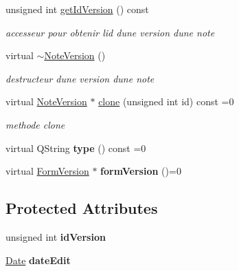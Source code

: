 \begin{DoxyCompactItemize}
\mbox{\label{class_note_version_a45dcb249d3bc6ce68f8c9dcabf153187}} 
unsigned int \hyperlink{class_note_version_a45dcb249d3bc6ce68f8c9dcabf153187}{get\+Id\+Version} () const
\begin{DoxyCompactList}\small\item\em accesseur pour obtenir l\textquotesingle{}id d\textquotesingle{}une version d\textquotesingle{}une note \end{DoxyCompactList}\item 
virtual \hyperlink{class_note_version_a84b32b9c97fa1de8b37b1170b9453f00}{$\sim$\+Note\+Version} ()
\begin{DoxyCompactList}\small\item\em destructeur d\textquotesingle{}une version d\textquotesingle{}une note \end{DoxyCompactList}\item 
virtual \hyperlink{class_note_version}{Note\+Version} $\ast$ \hyperlink{class_note_version_a7eb23a52291ec623b9bc1b6fe3e86c5a}{clone} (unsigned int id) const =0
\begin{DoxyCompactList}\small\item\em methode clone \end{DoxyCompactList}\item 
\mbox{\label{class_note_version_a950a828eafaae43fff4c37d990d3a4cc}} 
virtual Q\+String {\bfseries type} () const =0
\item 
\mbox{\label{class_note_version_a18ab9b2f07fb4a832218ca30db27e9bd}} 
virtual \hyperlink{class_form_version}{Form\+Version} $\ast$ {\bfseries form\+Version} ()=0
\end{DoxyCompactItemize}
\subsection*{Protected Attributes}
\begin{DoxyCompactItemize}
\item 
\mbox{\label{class_note_version_a933ace1d0a9c02d3c58dd4a905629adc}} 
unsigned int {\bfseries id\+Version}
\item 
\mbox{\label{class_note_version_ac1ccf3cfef8c72bba33ff65d688226fa}} 
\hyperlink{class_date}{Date} {\bfseries date\+Edit}
\end{DoxyCompactItemize}
